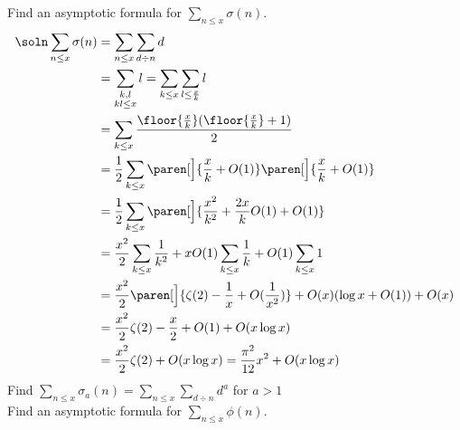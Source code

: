 \eg Find an asymptotic formula for $\sum_{n\leq x}\sigma(n)$.
\begin{align*}
\soln \sum_{n\leq x}\sigma(n) &= \sum_{n\leq x}\sum_{d\div n}d \\
&= \sum_{\substack{k,l\\kl\leq x}}l = \sum_{k\leq x}\sum_{l\leq\frac xk}l \\
&= \sum_{k\leq x}\frac{\floor{\frac xk}(\floor{\frac xk}+1)}{2} \\
&= \frac12\sum_{k\leq x}\paren[\Big]{\frac xk+O(1)}\paren[\Big]{\frac xk+O(1)} \\
&= \frac12\sum_{k\leq x}\paren[\Big]{\frac{x^2}{k^2}+\frac{2x}{k}O(1)+O(1)} \\
&= \frac{x^2}{2}\sum_{k\leq x}\frac1{k^2} + xO(1)\sum_{k\leq x}\frac1k + O(1)\sum_{k\leq x}1 \\
&= \frac{x^2}{2}\paren[\Big]{\zeta(2)-\frac1x+O(\frac1{x^2})} + O(x)(\log x+O(1)) + O(x) \\
&= \frac{x^2}{2}\zeta(2) - \frac{x}{2} + O(1) + O(x\log x) \\
&= \frac{x^2}{2}\zeta(2) + O(x\log x) = \frac{\pi^2}{12}x^2 + O(x\log x)
\end{align*}
\ex Find $\sum_{n\leq x}\sigma_a(n)=\sum_{n\leq x}\sum_{d\div n}d^a$ for $a>1$ \\
\eg Find an asymptotic formula for $\sum_{n\leq x}\phi(n)$.

